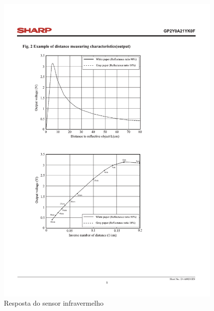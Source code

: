 \begin{figure}[h]
	\centering
	\caption{Resposta do sensor infravermelho}
	\label{fig:SensorIR}
	
	\includegraphics[trim= 3cm 15.8cm 6.5cm 4.8cm,clip,
scale=1]{Figuras/IR_Datasheet_Figure}

	
		
	
	

\end{figure}
